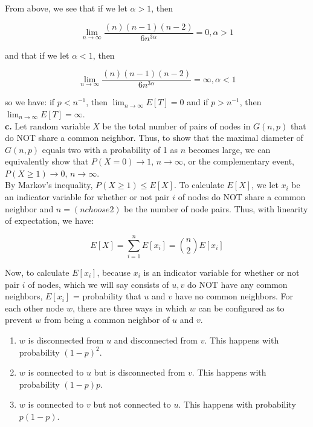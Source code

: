 \documentclass[12 pt]{article}
\begin{document}
	\noindent From above, we see that if we let $\alpha > 1$, then 
	
	\[\lim_{n \rightarrow \infty} \frac{(n)(n-1)(n-2)}{6n^{3\alpha}} = 0, \alpha > 1\]
	
	\noindent and that if we let $\alpha < 1$, then 
	
	\[\lim_{n \rightarrow \infty} \frac{(n)(n-1)(n-2)}{6n^{3\alpha}} = \infty, \alpha < 1\]
	
	\noindent so we have: if $p < n^{-1}$, then $\lim_{n \rightarrow \infty} E[T] = 0$ and if $p > n^{-1}$, then $\lim_{n \rightarrow \infty} E[T] = \infty$. \\
	
	\noindent \textbf{c.} Let random variable $X$ be the total number of pairs of nodes in $G(n,p)$ that do NOT share a common neighbor. Thus, to show that the maximal diameter of $G(n,p)$ equals two with a probability of 1 as $n$ becomes large, we can equivalently show that $P(X = 0) \rightarrow 1$, $n \rightarrow \infty$, or the complementary event, $P(X \geq 1) \rightarrow 0$, $n \rightarrow \infty$. \\
	
	\noindent By Markov's inequality, $P(X \geq 1) \leq E[X]$. To calculate $E[X]$, we let $x_i$ be an indicator variable for whether or not pair $i$ of nodes do NOT share a common neighbor and $n = ({n choose 2})$ be the number of node pairs. Thus, with linearity of expectation, we have:
	
	\[E[X] = \sum_{i=1}^n E[x_i] = {n \choose 2} E[x_i]\]
	
	\noindent Now, to calculate $E[x_i]$, because $x_i$ is an indicator variable for whether or not pair $i$ of nodes, which we will say consists of $u, v$ do NOT have any common neighbors, $E[x_i]$ = probability that $u$ and $v$ have no common neighbors.
	For each other node $w$, there are three ways in which $w$ can be configured as to prevent $w$ from being a common neighbor of $u$ and $v$.
	
	\begin{enumerate}
		\item $w$ is disconnected from $u$ and disconnected from $v$. This happens with probability $(1-p)^2$.
		\item $w$ is connected to $u$ but is disconnected from $v$. This happens with probability $(1-p)p$.
		\item $w$ is connected to $v$ but not connected to $u$. This happens with probability $p(1-p)$. 
	\end{enumerate}
\end{document}
